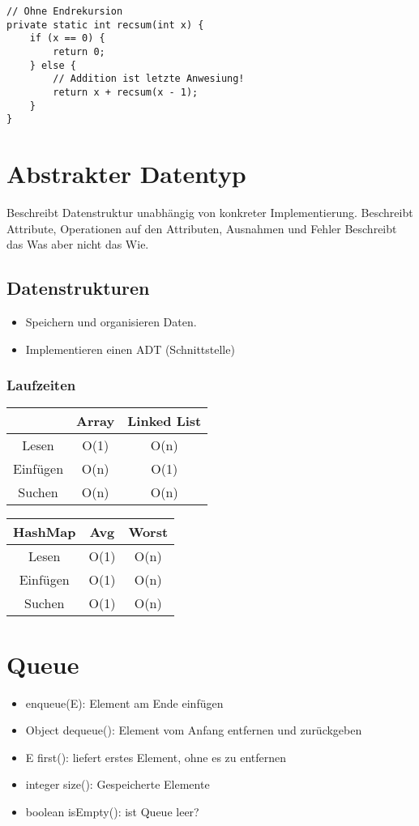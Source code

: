 \begin{multicols*}{4}
\begin{lstlisting}
// Ohne Endrekursion
private static int recsum(int x) {
	if (x == 0) {
		return 0;
	} else {
		// Addition ist letzte Anwesiung!
		return x + recsum(x - 1);
	}
}
		\end{lstlisting}

\section{Abstrakter Datentyp}
Beschreibt Datenstruktur unabhängig von konkreter Implementierung.
Beschreibt Attribute, Operationen auf den Attributen, Ausnahmen und Fehler
Beschreibt das Was aber nicht das Wie.

\subsection{Datenstrukturen}
	\begin{itemize}
		\item Speichern und organisieren Daten.
		\item Implementieren einen ADT (Schnittstelle)
	\end{itemize}

	\subsubsection{Laufzeiten}

		\begin{tabular}{c | c | c}
			& Array & Linked List \\
			\hline
			Lesen & O(1) & O(n) \\
			Einfügen & O(n) & O(1)  \\
			Suchen & O(n) & O(n) \\
		\end{tabular}
	
		\begin{tabular}{c | c | c}
			\textbf{HashMap} & Avg & Worst \\
			\hline
			Lesen & O(1) & O(n) \\
			Einfügen & O(1) & O(n)  \\
			Suchen & O(1) & O(n) \\
		\end{tabular}

\section{Queue}
	\begin{itemize}
		\item enqueue(E): Element am Ende einfügen
		\item Object dequeue(): Element vom Anfang entfernen und
		zurückgeben
		\item E first(): liefert erstes Element, ohne es zu entfernen
		\item integer size(): Gespeicherte Elemente
		\item boolean isEmpty(): ist Queue leer?
	\end{itemize}


\end{multicols*}
